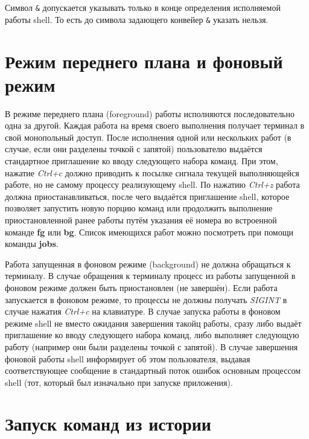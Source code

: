 \documentclass[11pt, a4paper]{article}
\begin{document}
Символ \verb#&# допускается указывать только в конце определения исполняемой работы shell. То есть 
до символа задающего конвейер \verb#&# указать нельзя.

\section{Режим переднего плана и фоновый режим}

В режиме переднего плана (foreground) работы исполняются последовательно одна за другой. 
Каждая работа на время своего выполнения получает терминал в свой монопольный доступ. 
После исполнения одной или нескольких работ (в случае, если они разделены точкой с запятой)
пользователю выдаётся стандартное приглашение ко вводу следующего набора команд. 
При этом, нажатие \textit{Ctrl+c} должно приводить к посылке сигнала текущей выполняющейся работе,
но не самому процессу реализующему shell. По нажатию \textit{Ctrl+z} работа должна 
приостанавливаться, после чего выдаётся приглашение shell, которое позволяет запустить новую порцию
команд или продолжить выполнение приостановленной ранее работы путём указания её номера во 
встроенной команде \textbf{fg} или \textbf{bg}. Список имеющихся работ можно посмотреть при 
помощи команды \textbf{jobs}.

Работа запущенная в фоновом режиме (background) не должна обращаться к терминалу. В случае обращения 
к терминалу процесс из работы запущенной в фоновом режиме должен быть приостановлен (не завершён). 
Если работа запускается в фоновом режиме, то процессы не должны получать \textit{SIGINT} 
в случае нажатия \textit{Ctrl+c} на клавиатуре. В случае запуска работы в фоновом режиме shell 
не вместо ожидания завершения такойц работы, сразу либо выдаёт приглашение ко вводу следующего 
набора команд, либо выполняет следующую работу (например они были разделены точкой с запятой). 
В случае завершения фоновой работы shell информирует об этом пользователя, выдавая соответствующее
сообщение в стандартный поток ошибок основным процессом shell
(тот, который был изначально при запуске приложения).

\section{Запуск команд из истории}
\end{document}
